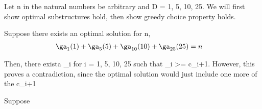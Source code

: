 Let n in the natural numbers be arbitrary and D = {1, 5, 10, 25}. We will first show optimal substructures hold, then show greedy choice property holds.

Suppose there exists an optimal solution for n,
\begin{align*}
    \ga_1 (1) + \ga_5 (5) + \ga_{10} (10) + \ga_{25} (25) &= n
\end{align*}

Then, there exista  \ga_i for i = {1, 5, 10, 25} such that \ga_i >= c_i+1. However, this proves a contradiction, since the optimal solution would 
just include one more of the c_i+1

Suppose 